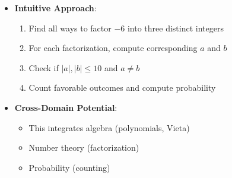 \documentclass[12pt]{article}
\begin{document}
\begin{problemconfigbox}
\begin{itemize}[leftmargin=*]
    \item \textbf{Intuitive Approach}: 
    \begin{enumerate}
        \item Find all ways to factor $-6$ into three distinct integers
        \item For each factorization, compute corresponding $a$ and $b$
        \item Check if $|a|, |b| \leq 10$ and $a \neq b$
        \item Count favorable outcomes and compute probability
    \end{enumerate}
    
    \item \textbf{Cross-Domain Potential}: 
    \begin{itemize}
        \item This integrates algebra (polynomials, Vieta)
        \item Number theory (factorization)
        \item Probability (counting)
    \end{itemize}
\end{itemize}
\end{problemconfigbox}
\end{document}

